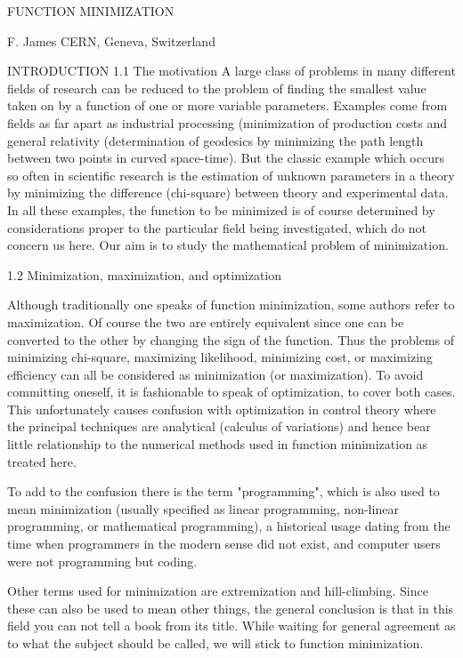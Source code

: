 FUNCTION MINIMIZATION
 
F. James
CERN, Geneva, Switzerland
 
 
 
 
INTRODUCTION
1.1  The motivation
     A large class of problems in many different fields of research can
be reduced to the problem of finding the smallest value taken on by a
function of one or more variable parameters.  Examples come from fields
as far apart as industrial processing (minimization of production costs
and general relativity (determination of geodesics by minimizing the
path length between two points in curved space-time).  But the classic
example which occurs so often in scientific research is the estimation of
unknown parameters in a theory by minimizing the difference (chi-square)
between theory and experimental data.  In all these examples, the function
to be minimized is of course determined by considerations proper to
the particular field being investigated, which do not concern us here.
Our aim is to study the mathematical problem of minimization.
 
 
1.2  Minimization, maximization, and optimization
 
     Although traditionally one speaks of function minimization, some
authors refer to maximization.  Of course the two are entirely equivalent
since one can be converted to the other by changing the sign of the function.
Thus the problems of minimizing chi-square, maximizing likelihood,
minimizing cost, or maximizing efficiency can all be considered as
minimization (or maximization).  To avoid committing oneself, it is
fashionable to speak of optimization, to cover both cases.  This 
unfortunately causes confusion with optimization in control theory where
the principal techniques are analytical (calculus of variations) and
hence bear little relationship to the numerical methods used in function
minimization as treated here.
 
      To add to the confusion there is the term "programming", which is
also used to mean minimization (usually specified as linear programming,
non-linear programming, or mathematical programming), a historical usage
dating from the time when programmers in the modern sense did not exist,
and computer users were not programming but coding.
 
      Other terms used for minimization are extremization and 
hill-climbing.  Since these can also be used to mean other things, the
general conclusion is that in this field you can not tell a book from
its title.  While waiting for general agreement as to what the subject
should be called, we will stick to function minimization.
 
